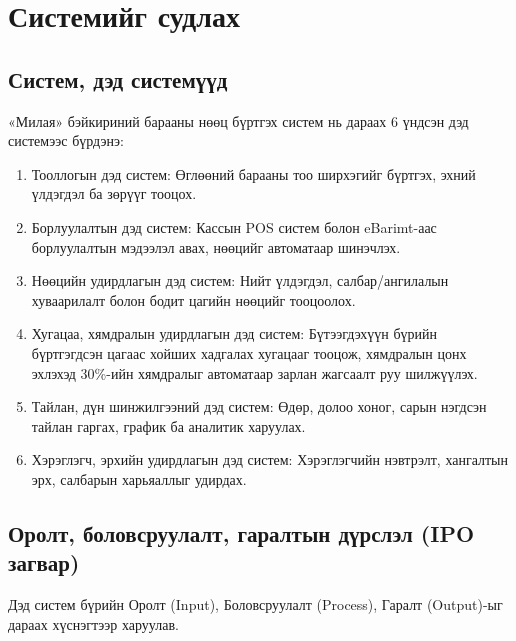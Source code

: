 \section{Системийг судлах}

\subsection{Систем, дэд системүүд}
«Милая» бэйкириний барааны нөөц бүртгэх систем нь дараах 6 үндсэн дэд системээс бүрдэнэ:

\begin{enumerate}
    \item Тооллогын дэд систем: Өглөөний барааны тоо ширхэгийг бүртгэх, эхний үлдэгдэл ба зөрүүг тооцох.
    \item Борлуулалтын дэд систем: Кассын POS систем болон eBarimt-аас борлуулалтын мэдээлэл авах, нөөцийг автоматаар шинэчлэх.
    \item Нөөцийн удирдлагын дэд систем: Нийт үлдэгдэл, салбар/ангилалын хуваарилалт болон бодит цагийн нөөцийг тооцоолох.
    \item Хугацаа, хямдралын удирдлагын дэд систем: Бүтээгдэхүүн бүрийн бүртгэгдсэн цагаас хойших хадгалах хугацааг тооцож, хямдралын цонх эхлэхэд 30\%-ийн хямдралыг автоматаар зарлан жагсаалт руу шилжүүлэх.
    \item Тайлан, дүн шинжилгээний дэд систем: Өдөр, долоо хоног, сарын нэгдсэн тайлан гаргах, график ба аналитик харуулах.
    \item Хэрэглэгч, эрхийн удирдлагын дэд систем: Хэрэглэгчийн нэвтрэлт, хангалтын эрх, салбарын харьяаллыг удирдах.
\end{enumerate}

\subsection{Оролт, боловсруулалт, гаралтын дүрслэл (IPO загвар)}
Дэд систем бүрийн Оролт (Input), Боловсруулалт (Process), Гаралт (Output)-ыг дараах хүснэгтээр харуулав.

